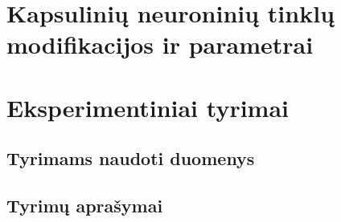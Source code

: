 \documentclass{VUMIFInfMagistrinis}
\begin{document}
\section{Kapsulinių neuroninių tinklų modifikacijos ir parametrai}


\section{Eksperimentiniai tyrimai}

\subsection{Tyrimams naudoti duomenys}


\subsection{Tyrimų aprašymai}




\printbibliography[heading=bibintoc]  %

\appendix  %
\end{document}
